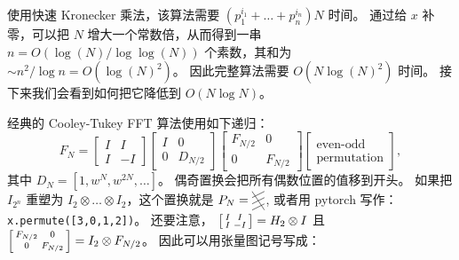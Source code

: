 使用快速 Kronecker 乘法，该算法需要 $(p_1^{i_1}+\dots+p_n^{i_n}) N$ 时间。
通过给 $x$ 补零，可以把 $N$ 增大一个常数倍，从而得到一串 $n=O(\log(N)/\log\log(N))$ 个素数，其和为 $\sim n^2/\log n = O(\log(N)^2)$。
因此完整算法需要 $O(N \log(N)^2)$ 时间。
接下来我们会看到如何把它降低到 $O(N\log N)$。

经典的 Cooley-Tukey FFT 算法使用如下递归：
\[
   \renewcommand*{\arraystretch}{1.3}
F_N =
\begin{bmatrix}
I & I \\
I & -I
\end{bmatrix}
\begin{bmatrix}
I & 0 \\
0 & D_{N/2}
\end{bmatrix}
\begin{bmatrix}
F_{N/2} & 0 \\
0 & F_{N/2}
\end{bmatrix}
\begin{bmatrix}
\text{even-odd} \\
\text{permutation}
\end{bmatrix}
,
\]
其中 $D_N = [1, w^N, w^{2N}, \dots]$。
偶奇置换会把所有偶数位置的值移到开头。
如果把 $I_{2^n}$ 重塑为 $I_2\otimes\dots\otimes I_2$，这个置换就是
$
P_N = \begin{tikzpicture}[baseline=.5em, x=1em, y=.5em]
    \draw (0,0) -- (1, 1);
    \draw (0,1) -- (1, 2);
    \draw (0,2) -- (1, 3);
    \draw (0,3) -- (1, 0);
\end{tikzpicture}
$,
或者用 pytorch 写作：\texttt{x.permute([3,0,1,2])}。
还要注意，
$\left[\begin{smallmatrix}I&I\\I&-I\end{smallmatrix}\right] = H_2 \otimes I$ 且 $\left[\begin{smallmatrix}F_{N/2} & 0\\0&F_{N/2}\end{smallmatrix}\right]=I_2 \otimes F_{N/2}$。
因此可以用张量图记号写成：
